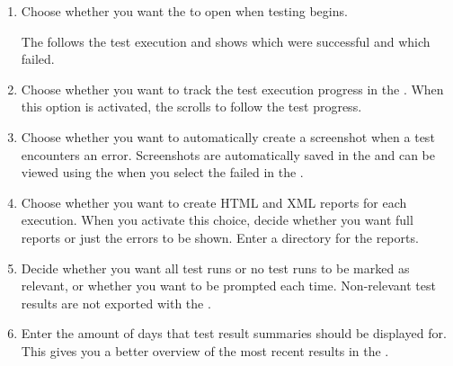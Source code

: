 \begin{enumerate}
\item Choose whether you want the  \gdtestresultview{} to open when testing begins. 

The \gdtestresultview{} follows the test execution and shows which \gdsteps{} were successful and which failed. 

\item Choose whether you want to track the test execution progress in the \gdtestresultview{}. When this option is activated, the \gdtestresultview{} scrolls to follow the test progress. 
\item Choose whether you want \app{} to automatically create a screenshot when a test encounters an error. Screenshots are automatically saved in the \gddb{} and can be viewed using the \gdimgview{} when you select the failed \gdstep{} in the \gdtestresultview{}. 
\item Choose whether you want to create HTML and XML reports for each execution. When you activate this choice, decide whether you want full reports or just the errors to be shown. Enter a directory for the reports. 
\item Decide whether you want all test runs or no test runs to be marked as relevant, or whether you want to be prompted each time. Non-relevant test results are not exported with the \gdproject{}. 
\item Enter the amount of days that test result summaries should be displayed for. This gives you a better overview of the most recent results in the \gdtestsummaryview{}. 
\end{enumerate}


